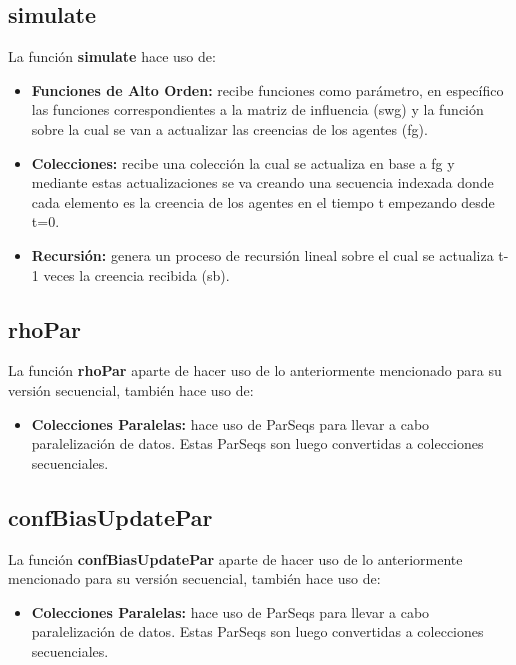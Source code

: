 \documentclass{article}
\begin{document}
    \subsection{simulate}
    La función \textbf{simulate} hace uso de:

    \begin{itemize}
      \item \textbf{Funciones de Alto Orden:} recibe funciones como parámetro, en específico las funciones correspondientes a la matriz de influencia (swg) y la función sobre la cual se van a actualizar las creencias de los agentes (fg).
      \item \textbf{Colecciones:} recibe una colección la cual se actualiza en base a fg y mediante estas actualizaciones se va creando una secuencia indexada donde cada elemento es la creencia de los agentes en el tiempo t empezando desde t=0.
      \item \textbf{Recursión:} genera un proceso de recursión lineal sobre el cual se actualiza t-1 veces la creencia recibida (sb).
    \end{itemize}

    \subsection{rhoPar}
    La función \textbf{rhoPar} aparte de hacer uso de lo anteriormente mencionado para su versión secuencial, también hace uso de:

    \begin{itemize}
      \item \textbf{Colecciones Paralelas:} hace uso de ParSeqs para llevar a cabo paralelización de datos. Estas ParSeqs son luego convertidas a colecciones secuenciales.
    \end{itemize}

    \subsection{confBiasUpdatePar}
    La función \textbf{confBiasUpdatePar} aparte de hacer uso de lo anteriormente mencionado para su versión secuencial, también hace uso de:

    \begin{itemize}
      \item \textbf{Colecciones Paralelas:} hace uso de ParSeqs para llevar a cabo paralelización de datos. Estas ParSeqs son luego convertidas a colecciones secuenciales.
    \end{itemize}
\end{document}
